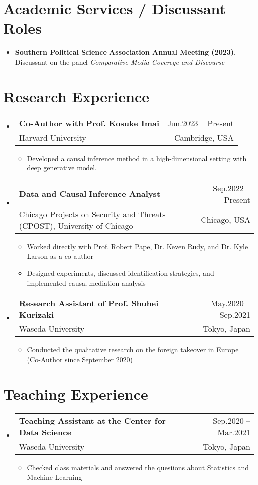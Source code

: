 \documentclass[letterpaper,11pt]{article} %
\makeatletter
\newcommand{\CVItem}[1]{
  \item\small{
    {#1 \vspace{-2pt}}
  }
}
\newcommand{\CVSubheading}[4]{
  \vspace{-2pt}\item
    \begin{tabular*}{0.97\textwidth}[t]{l@{\extracolsep{\fill}}r}
      \textbf{#1} & #2 \\
      \small#3 & \small #4 \\
    \end{tabular*}\vspace{-7pt}
}
\newcommand{\CVSubHeadingListStart}{\begin{itemize}[leftmargin=0.5cm, label={}]}
\newcommand{\CVSubHeadingListEnd}{\end{itemize}}
\newcommand{\CVItemListStart}{\begin{itemize}}
\newcommand{\CVItemListEnd}{\end{itemize}\vspace{-5pt}}
\makeatother
\begin{document}
\section{Academic Services / Discussant Roles}
\begin{itemize}[leftmargin=0.5cm, label={}]
    \item{\textbf{Southern Political Science Association Annual Meeting (2023)}, Discussant on the panel \textit{Comparative Media Coverage and Discourse}}
\end{itemize}

\section{Research Experience}
\CVSubHeadingListStart
\CVSubheading
      {Co-Author with Prof. Kosuke Imai}{Jun.2023 -- Present}
      {Harvard University}{Cambridge, USA}
      \CVItemListStart
        \CVItem{Developed a causal inference method in a high-dimensional setting with deep generative model.}
      \CVItemListEnd

\CVSubheading
      {Data and Causal Inference Analyst}{Sep.2022 -- Present}
      {Chicago Projects on Security and Threats (CPOST), University of Chicago}{Chicago, USA}
      \CVItemListStart
        \CVItem{Worked directly with Prof. Robert Pape, Dr. Keven Rudy, and Dr. Kyle Larson as a co-author}
        \CVItem{Designed experiments, discussed identification strategies, and implemented causal mediation analysis}
      \CVItemListEnd

    \CVSubheading
      {Research Assistant of Prof. Shuhei Kurizaki}{May.2020 -- Sep.2021}
      {Waseda University}{Tokyo, Japan}
      \CVItemListStart
        \CVItem{Conducted the qualitative research on the foreign takeover in Europe (Co-Author since September 2020)}
      \CVItemListEnd
\CVSubHeadingListEnd
      
\section{Teaching Experience}
\CVSubHeadingListStart
    \CVSubheading
      {Teaching Assistant at the Center for Data Science}{Sep.2020 -- Mar.2021}
      {Waseda University}{Tokyo, Japan}
      \CVItemListStart
        \CVItem {Checked class materials and answered the questions about Statistics and Machine Learning}
      \CVItemListEnd
  \CVSubHeadingListEnd
\end{document}
